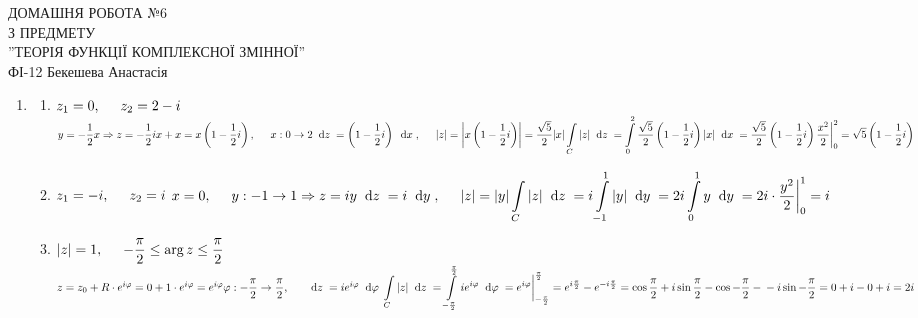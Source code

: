 \documentclass[a4paper,12pt]{article}
\newcommand\tab[1][0.5cm]{\hspace*{#1}}
\newcommand\dx[1]{\hspace*{0.2cm}\textrm{d}{#1}\hspace*{0.1cm}}
\newcommand\dint[0]{\displaystyle\int}
\begin{document}
	\begin{justify}
		\thispagestyle{empty}\setlength{\parindent}{0pt}
 		\vspace*{\fill}
  		\begin{center}
  			\noindent\makebox[\linewidth]{\rule{\paperwidth}{0.4pt}}
   			\LARGE{\bigbreak ДОМАШНЯ РОБОТА №6\\З ПРЕДМЕТУ\\''ТЕОРІЯ ФУНКЦІЇ КОМПЛЕКСНОЇ ЗМІННОЇ''\\\bigbreak} 
   			ФІ-12 Бекешева Анастасія 
   			\noindent\makebox[\linewidth]{\rule{\paperwidth}{0.4pt}}
  		\end{center}
 		\vspace*{\fill}\newpage
 		\begin{enumerate}
 		\item 	
 		\begin{enumerate}
 			\item $z_1=0,\tab z_2=2-i$
 				$\\y=-\dfrac12x\Rightarrow z=-\dfrac12ix+x=x\left(1-\dfrac12i\right),\tab x:0\to2\\\dx{z}=\left(1-\dfrac12i\right)\dx{x},\tab |z|=\left|x\left(1-\dfrac12i\right)\right|=\dfrac{\sqrt5}2|x|\\\dint\limits_C|z|\dx{z}=\dint\limits_0^2\dfrac{\sqrt5}2\left(1-\dfrac12i\right)|x|\dx{x}=\dfrac{\sqrt5}2\left(1-\dfrac12i\right)\dfrac{x^2}{2}\bigg|_{0}^2=\sqrt5\left(1-\dfrac12i\right)$
 			\item $z_1=-i,\tab z_2=i$
 				$\\x=0,\tab y:-1\to1\Rightarrow z=iy\\\dx{z}=i\dx{y},\tab|z|=|y|\\\dint\limits_C|z|\dx{z}=i\dint\limits_{-1}^1|y|\dx{y}=2i\dint\limits_0^1 y\dx{y}=2i\cdot\dfrac{y^2}{2}\bigg|_0^1=i$
			\item $|z|=1,\tab -\dfrac\pi2\leq\arg z\leq\dfrac\pi2$
				$z=z_0+R\cdot e^{i\varphi}=0+1\cdot e^{i\varphi}=e^{i\varphi}\\\varphi:-\dfrac\pi2\to\dfrac\pi2,\tab \dx{z}=ie^{i\varphi}\dx{\varphi}\\\dint\limits_C|z|\dx{z}=\dint\limits_{-\frac{\pi}{2}}^{\frac{\pi}{2}}ie^{i\varphi}\dx{\varphi}=e^{i\varphi}\bigg|_{-\frac{\pi}{2}}^{\frac{\pi}{2}}=e^{i\frac\pi2}-e^{-i\frac\pi2}=\cos\dfrac{\pi}{2}+i\sin\dfrac{\pi}{2}-\cos-\dfrac{\pi}{2}-\\-i\sin-\dfrac{\pi}{2}=0+i-0+i=2i$
 				\begin{figure*}[htp]\centering
 					\begin{tikzpicture}[scale=0.6]

\end{tikzpicture}
\end{figure*}
\end{enumerate}
\end{enumerate}
\end{justify}
\end{document}

